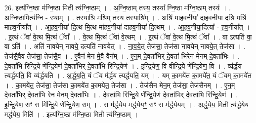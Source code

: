 \documentclass[17pt]{extarticle}
\begin{document}
26. इत्य॑ग्नि॒ष्ठा म॑ग्नि॒ष्ठा मिती त्य॑ग्नि॒ष्ठाम् । . अ॒ग्नि॒ष्ठाम् तस्य॒ तस्या᳚ ग्नि॒ष्ठा म॑ग्नि॒ष्ठाम् तस्य॑ । . अ॒ग्नि॒ष्ठामित्य॑ग्नि - स्थाम् । . तस्याश्रि॒ मश्रि॒म् तस्य॒ तस्याश्रि᳚म् । . अश्रि॑ माहव॒नीया॑ दाहव॒नीया॒ दश्रि॒ मश्रि॑ माहव॒नीया᳚त् । . आ॒ह॒व॒नीया॑ दि॒त्थ मि॒त्थ मा॑हव॒नीया॑ दाहव॒नीया॑ दि॒त्थम् । . आ॒ह॒व॒नीया॒दित्या᳚ - ह॒व॒नीया᳚त् । . इ॒त्थं ॅवा॑ वे॒त्थ मि॒त्थं ॅवा᳚ । . वे॒त्थ मि॒त्थं ॅवा॑ वे॒त्थम् । . इ॒त्थं ॅवा॑ वे॒त्थ मि॒त्थं ॅवा᳚ । . वा ऽत्यति॑ वा॒ वा ऽति॑ । . अति॑ नावयेन् नावये॒ दत्यति॑ नावयेत् । . ना॒व॒ये॒त् तेज॑सा॒ तेज॑सा नावयेन् नावये॒त् तेज॑सा । . तेज॑सै॒वैव तेज॑सा॒ तेज॑सै॒व । . ए॒वैन॑ मेन मे॒वै वैन᳚म् । . ए॒न॒म् दे॒वता॑भिर् दे॒वता॑ भिरेन मेनम् दे॒वता॑भिः । . दे॒वता॑भि रिन्द्रि॒ये णे᳚न्द्रि॒येण॑ दे॒वता॑भिर् दे॒वता॑भि रिन्द्रि॒येण॑ । . इ॒न्द्रि॒येण॒ वि वीन्द्रि॒ये णे᳚न्द्रि॒येण॒ वि । . व्य॑र्द्धय त्यर्द्धयति॒ वि व्य॑र्द्धयति । . अ॒र्द्ध॒य॒ति॒ यं ॅय म॑र्द्धय त्यर्द्धयति॒ यम् । . यम् का॒मये॑त का॒मये॑त॒ यं ॅयम् का॒मये॑त । . का॒मये॑त॒ तेज॑सा॒ तेज॑सा का॒मये॑त का॒मये॑त॒ तेज॑सा । . तेज॑सैन मेन॒म् तेज॑सा॒ तेज॑सैनम् । . ए॒न॒म् दे॒वता॑भिर् दे॒वता॑भि रेन मेनम् दे॒वता॑भिः । . दे॒वता॑भि रिन्द्रि॒ये णे᳚न्द्रि॒येण॑ दे॒वता॑भिर् दे॒वता॑भि रिन्द्रि॒येण॑ । . इ॒न्द्रि॒येण॒ सꣳ स मि॑न्द्रि॒ये णे᳚न्द्रि॒येण॒ सम् । . स म॑र्द्धयेय मर्द्धयेयꣳ॒॒ सꣳ स म॑र्द्धयेयम् । . अ॒र्द्ध॒ये॒य॒ मिती त्य॑र्द्धयेय मर्द्धयेय॒ मिति॑ । . इत्य॑ग्नि॒ष्ठा म॑ग्नि॒ष्ठा मिती त्य॑ग्नि॒ष्ठाम् । \newline
\end{document}
